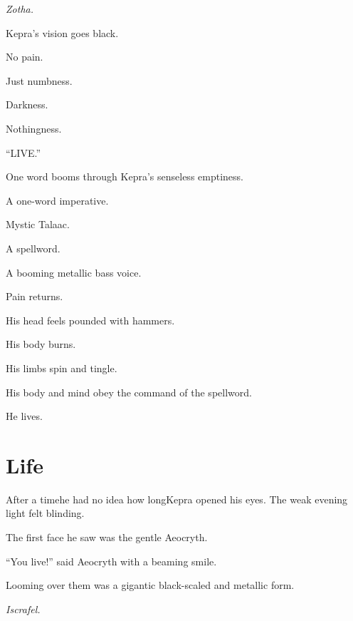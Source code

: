 \documentclass
  [a4paper,
   12pt,
   oneside
  ]%
  {article}
\newcommand{\sectionbreak}{\bigskip\noindent}
\begin{document}
\emph{Zotha.}

Kepra’s vision goes black. 

No pain. 

Just numbness. 

Darkness.

Nothingness.



\sectionbreak
{\Large{``{LIVE.}''}}


\sectionbreak
One word booms through Kepra’s senseless emptiness. 

A one-word imperative.

Mystic Talaac.

A spellword.

A booming metallic bass voice. 

Pain returns. 

His head feels pounded with hammers. 

His body burns. 

His limbs spin and tingle. %

His body and mind obey the command of the spellword. 

He lives.



\section{Life}

After a time\dash{}he had no idea how long\dash{}Kepra opened his eyes. 
The weak evening light felt blinding. 

The first face he saw was the gentle Aeocryth. 

``You live!'' said Aeocryth with a beaming smile. 

Looming over them was a gigantic black-scaled and metallic form.

\emph{Iscrafel.}


\end{document}
